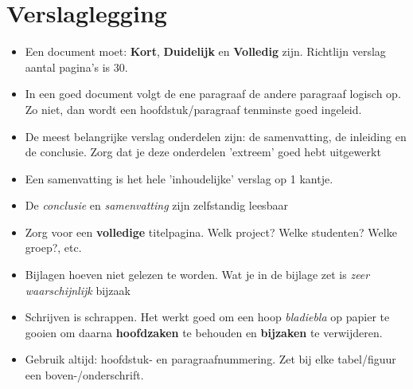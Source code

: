 \documentclass[24pt,a4paper]{article}
\begin{document}
\section{Verslaglegging}
\begin{itemize}
      \mssep
      \item Een document moet: \textbf{Kort}, \textbf{Duidelijk} en \textbf{Volledig} zijn. Richtlijn verslag aantal pagina's is $30$.
      \item In een goed document volgt de ene paragraaf de andere paragraaf logisch op. Zo niet, dan wordt een hoofdstuk/paragraaf tenminste goed ingeleid.
      \item De meest belangrijke verslag onderdelen zijn: de samenvatting, de inleiding en de conclusie. Zorg dat je deze onderdelen 'extreem' goed hebt uitgewerkt
      \item Een samenvatting is het hele 'inhoudelijke' verslag op 1 kantje.
      \item De \textit{conclusie} en \textit{samenvatting} zijn zelfstandig leesbaar
      \item Zorg voor een \textbf{volledige} titelpagina. Welk project? Welke studenten? Welke groep?, etc.
      \item Bijlagen hoeven niet gelezen te worden. Wat je in de bijlage zet is \textit{zeer waarschijnlijk} bijzaak
      \item Schrijven is schrappen. Het werkt goed om een hoop \textit{bladiebla} op papier te gooien om daarna \textbf{hoofdzaken} te behouden en \textbf{bijzaken} te verwijderen.
      \item Gebruik altijd: hoofdstuk- en paragraafnummering. Zet bij elke tabel/figuur een boven-/onderschrift.

\end{itemize}


\newpage
\end{document}
